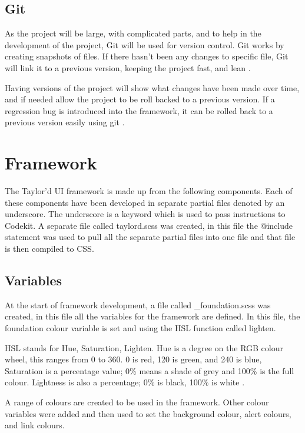 \subsection*{Git}
As the project will be large, with complicated parts, and to help in the development of the project, Git will be used for version control. Git works by creating snapshots of files. If there hasn't been any changes to specific file, Git will link it to a previous version, keeping the project fast, and lean \citep{GIT05}.

Having versions of the project will show what changes have been made over time, and if needed allow the project to be roll backed to a previous version. If a regression bug is introduced into the framework, it can be rolled back to a previous version easily using git \citep{ATL16}.

\newpage
\section*{Framework}
The Taylor'd UI framework is made up from the following components. Each of these components have been developed in separate partial files denoted by an underscore. The underscore is a keyword which is used to pass instructions to Codekit. A separate file called taylord.scss was created, in this file the @include statement was used to pull all the separate partial files into one file and that file is then compiled to \gls{CSS}. 

\subsection*{Variables}
At the start of framework development, a file called \_foundation.scss was created, in this file all the variables for the framework are defined. In this file, the foundation colour variable is set and using the \gls{HSL} function called lighten. 

\gls{HSL} stands for Hue, Saturation, Lighten. Hue is a degree on the RGB colour wheel, this ranges from 0 to 360. 0 is red, 120 is green, and 240 is blue, Saturation is a percentage value; 0\% means a shade of grey and 100\% is the full colour. Lightness is also a percentage; 0\% is black, 100\% is white \citep{HSL16}.

A range of colours are created to be used in the framework. Other colour variables were added and then used to set the background colour, alert colours, and link colours.

